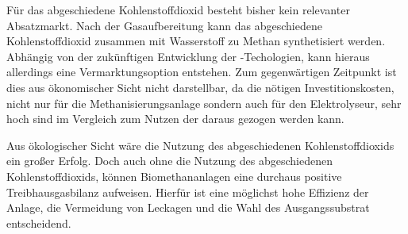 Für das abgeschiedene Kohlenstoffdioxid besteht bisher kein relevanter Absatzmarkt. Nach der Gasaufbereitung kann das abgeschiedene Kohlenstoffdioxid zusammen mit Wasserstoff zu Methan synthetisiert werden. Abhängig von der zukünftigen Entwicklung der -Techologien, kann hieraus allerdings eine Vermarktungsoption entstehen. Zum gegenwärtigen Zeitpunkt ist dies aus ökonomischer Sicht nicht darstellbar, da die nötigen Investitionskosten, nicht nur für die Methanisierungsanlage sondern auch für den Elektrolyseur, sehr hoch sind im Vergleich zum Nutzen der daraus gezogen werden kann.\smallskip

Aus ökologischer Sicht wäre die Nutzung des abgeschiedenen Kohlenstoffdioxids ein großer Erfolg. Doch auch ohne die Nutzung des abgeschiedenen Kohlenstoffdioxids, können Biomethananlagen eine durchaus positive Treibhausgasbilanz aufweisen. Hierfür ist eine möglichst hohe Effizienz der Anlage, die Vermeidung von Leckagen und die Wahl des Ausgangssubstrat entscheidend.
